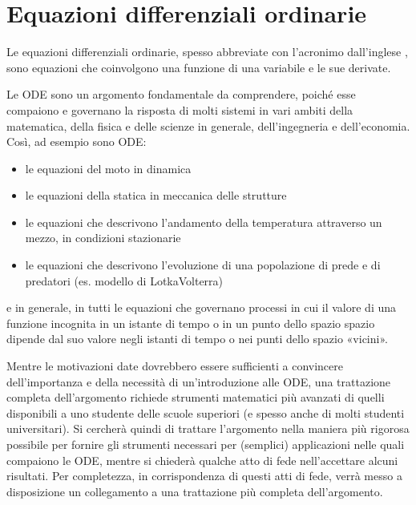 \documentclass[letterpaper,10pt,italian]{jupyterBook}
\begin{document}
\chapter{Equazioni differenziali ordinarie}
\label{\detokenize{ch/ode:equazioni-differenziali-ordinarie}}\label{\detokenize{ch/ode:ode-hs}}\label{\detokenize{ch/ode::doc}}
\sphinxAtStartPar
Le equazioni differenziali ordinarie, spesso abbreviate con l’acronimo  dall’inglese , sono equazioni che coinvolgono una funzione di una variabile e le sue derivate.

\sphinxAtStartPar
{} Le ODE sono un argomento fondamentale da comprendere, poiché esse compaiono e governano la risposta di molti sistemi in vari ambiti della matematica, della fisica e delle scienze in generale, dell’ingegneria e dell’economia. Così, ad esempio sono ODE:
\begin{itemize}
\item {} 
\sphinxAtStartPar
le equazioni del moto in dinamica

\item {} 
\sphinxAtStartPar
le equazioni della statica in meccanica delle strutture

\item {} 
\sphinxAtStartPar
le equazioni che descrivono l’andamento della temperatura attraverso un mezzo, in condizioni stazionarie

\item {} 
\sphinxAtStartPar
le equazioni che descrivono l’evoluzione di una popolazione di prede e di predatori (es. modello di Lotka\sphinxhyphen{}Volterra)

\end{itemize}

\sphinxAtStartPar
e in generale, in tutti le equazioni che governano processi in cui il valore di una funzione incognita in un istante di tempo o in un punto dello spazio spazio dipende dal suo valore negli istanti di tempo o nei punti dello spazio «vicini».

\sphinxAtStartPar
{}
Mentre le motivazioni date dovrebbero essere sufficienti a convincere dell’importanza e della necessità di un’introduzione alle ODE, una trattazione completa dell’argomento richiede strumenti matematici più avanzati di quelli disponibili a uno studente delle scuole superiori (e spesso anche di molti studenti universitari).
Si cercherà quindi di trattare l’argomento nella maniera più rigorosa possibile per fornire gli strumenti necessari per (semplici) applicazioni nelle quali compaiono le ODE, mentre si chiederà qualche atto di fede nell’accettare alcuni risultati. Per completezza, in corrispondenza di questi atti di fede, verrà messo a disposizione un collegamento a una trattazione più completa dell’argomento.
\end{document}
